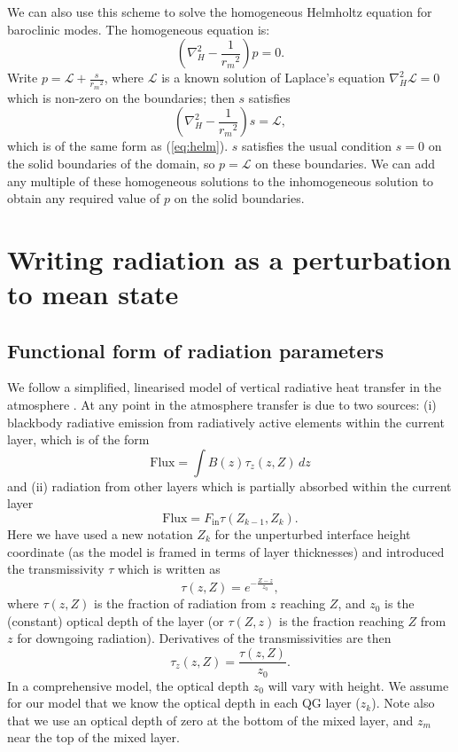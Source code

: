 \documentclass[11pt, a4paper,twoside]{article}
\newcommand{\rdm}[0]{{r_m}}
\numberwithin{equation}{section}
\begin{document}
We can also use this scheme to solve the homogeneous Helmholtz equation for baroclinic modes.
The homogeneous equation is:
\begin{equation}\label{eq:helm1}
\left(\nabla_H^2- \frac{1}{\rdm^2} \right) p = 0.
\end{equation}
Write $p = \mathcal{L} + \frac{s}{\rdm^2}$, where $\mathcal{L}$ is a known solution of Laplace's equation $\nabla_H^2 \mathcal{L} = 0$ which is non-zero on the boundaries; then $s$ satisfies
\begin{equation}\label{eq:helm2}
\left(\nabla_H^2- \frac{1}{\rdm^2} \right) s = \mathcal{L},
\end{equation}
which is of the same form as (\ref{eq:helm}).
$s$ satisfies the usual condition $s = 0$ on the solid boundaries of the domain, so $p = \mathcal{L}$ on these boundaries.
We can add any multiple of these homogeneous solutions to the inhomogeneous solution to obtain any required value of $p$ on the solid boundaries.


\newpage

\appendix

\section{Writing radiation as a perturbation to mean state}\label{app:rad}

\subsection{Functional form of radiation parameters}
We follow a simplified, linearised model of vertical radiative heat transfer in the atmosphere \citep[see][for details on the basics of radiative balance]{peixoto:92}.
At any point in the atmosphere transfer is due to two sources: (i)  blackbody radiative emission from radiatively active elements within the current layer, which is of the form
\[ \textrm{Flux} = \int B(z) \tau_z(z,Z) \, dz\]
and (ii) radiation from other layers which is partially absorbed within the current layer
\[ \textrm{Flux} = F_{\textrm{in}}\tau(Z_{k-1},Z_{k}).\]
Here we have used a new notation $Z_k$ for the unperturbed interface height coordinate (as the model is framed in terms of layer thicknesses) and introduced the transmissivity $\tau$ which is written as
\begin{equation}
\tau(z,Z) = e^{-\frac{Z-z}{z_0}},
\end{equation}
where $\tau(z,Z)$ is the fraction of radiation from $z$ reaching $Z$, and $z_0$ is the (constant) optical depth of the layer (or $\tau(Z,z)$ is the fraction reaching $Z$ from $z$ for downgoing radiation).
Derivatives of the transmissivities are then
\begin{equation}
\tau_z(z,Z) = \frac{\tau(z,Z)}{z_0}.
\end{equation}
In a comprehensive model, the optical depth $z_0$ will vary with height.
We assume for our model that we know the optical depth in each QG layer ($z_k$).
Note also that we use an optical depth of zero at the bottom of the mixed layer, and $z_m$ near the top of the mixed layer.
\end{document}
